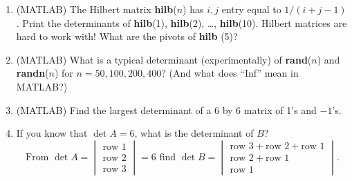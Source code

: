 \documentclass[14pt, a4paper]{article}
\begin{document}
\begin{enumerate}[resume]
    \item (MATLAB) The Hilbert matrix \textbf{hilb}($n$) has $i,j$ entry equal to $1/(i + j - 1)$. Print the determinants of \textbf{hilb}(1), \textbf{hilb}(2), \dots, \textbf{hilb}(10). Hilbert matrices are hard to work with! What are the pivots of \textbf{hilb} (5)?

    \item (MATLAB) What is a typical determinant (experimentally) of \textbf{rand}($n$) and \textbf{randn}($n$) for $n = 50, 100, 200, 400$? (And what does ``Inf'' mean in MATLAB?)

    \item (MATLAB) Find the largest determinant of a 6 by 6 matrix of 1's and $-1$'s.

    \item If you know that $\det A = 6$, what is the determinant of $B$?
          \[
              \text{From } \det A = \begin{vmatrix} \text{row } 1 \\ \text{row } 2 \\ \text{row } 3 \end{vmatrix} = 6 \text{ find } \det B = \begin{vmatrix} \text{row } 3 + \text{row } 2 + \text{row } 1 \\ \text{row } 2 + \text{row } 1 \\ \text{row } 1 \end{vmatrix}.
          \]
\end{enumerate}
\end{document}
